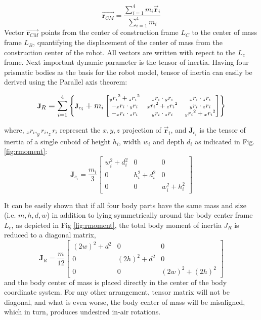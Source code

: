 \begin{equation}\label{eq:CMrobot}
\vec{\textbf{r}_{CM}}=\frac{\sum_{i=1}^{4}m_i\vec{\textbf{r}}_i}{\sum_{i=1}^{4}m_i}
\end{equation}
Vector $\vec{\textbf{r}_{CM}}$ points from the center of construction frame $L_C$ to the center of mass frame $L_B$, quantifying the displacement of the center of mass from the construction center of the robot. All vectors are written with repect to the $L_c$ frame. Next important dynamic parameter is the tensor of inertia. Having four prismatic bodies as the basis for the robot model, tensor of inertia can easily be derived using the Parallel axis theorem:

\begin{equation}
\footnotesize
\textbf{J}_R=\sum_{i=1}^{4}\left \{\textbf{J}_{c_i}+m_i\begin{bmatrix}
{_yr_i}^2+{_zr_i}^2 & {_xr_i}\cdot {_yr_i} & {_xr_i}\cdot {_zr_i} \\ 
-{_xr_i}\cdot {_yr_i} & {_xr_i}^2+{_zr_i}^2 & {_yr_i}\cdot {_zr_i}\\ 
-{_xr_i}\cdot {_zr_i} & {_yr_i}\cdot {_zr_i} & {_yr_i}^2+{_xr_i}^2
\end{bmatrix} \right \}
\normalsize
\end{equation}

where, $_xr_i, _yr_i, _zr_i$ represent the $x,y,z$ projection of $\vec{\textbf{r}}_i$, and $\textbf{J}_{c_i}$ is the tensor of inertia of a single cuboid of height $h_i$, width $w_i$ and depth $d_i$ as indicated in Fig. \ref{fig:rmoment}:
\begin{equation}
\textbf{J}_{c_i}=\frac{m_i}{3}\begin{bmatrix}
w_i^2+d_i^2 &0&0 \\ 
0 &h_i^2+d_i^2&0\\ 
0 &0& w_i^2+h_i^2
\end{bmatrix}
\end{equation} 

It can be easily shown that if all four body parts have the same mass and size (i.e. $m,h,d,w$) in addition to lying symmetrically around the body center frame $L_c$, as depicted in Fig \ref{fig:rmoment}, the total body moment of inertia $J_R$ is reduced to a diagonal matrix,
\begin{equation}
\textbf{J}_{R}=\frac{m}{12}\begin{bmatrix}
(2w)^2+d^2 &0&0 \\ 
0 &(2h)^2+d^2&0\\ 
0 &0& (2w)^2+(2h)^2
\end{bmatrix}
\end{equation} 
and the body center of mass is placed directly in the center of the body coordinate system. For any other arrangement, tensor matrix will not be diagonal, and what is even worse, the body center of mass will be misaligned, which in turn, produces undesired in-air rotations.

